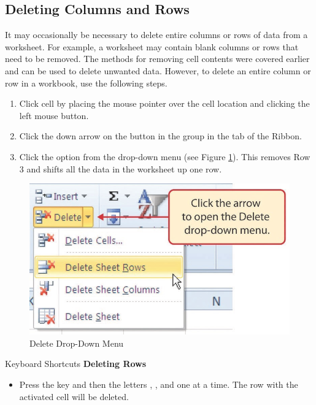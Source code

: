 \subsection{Deleting Columns and Rows}

It may occasionally be necessary to delete entire columns or rows of data from a worksheet. For example, a worksheet may contain blank columns or rows that need to be removed. The methods for removing cell contents were covered earlier and can be used to delete unwanted data. However, to delete an entire column or row in a workbook, use the following steps.

\begin{enumerate}
	\item Click cell  by placing the mouse pointer over the cell location and clicking the left mouse button.
	\item Click the down arrow on the  button in the  group in the  tab of the Ribbon.
	\item Click the  option from the drop-down menu (see Figure \ref{01:fig31}). This removes Row 3 and shifts all the data in the worksheet up one row.
\end{enumerate}

\begin{figure}[H]
	\centering
	\includegraphics[width=\maxwidth{.95\linewidth}]{gfx/ch01_fig31}
	\caption{Delete Drop-Down Menu}
	\label{01:fig31}
\end{figure}

\begin{center}
	\begin{shtcutbox}{Keyboard Shortcuts}
		\textbf{Deleting Rows}
		\\
		\begin{itemize}
			\setlength{\itemsep}{0pt}
			\setlength{\parskip}{0pt}
			\setlength{\parsep}{0pt}
			
			\item Press the  key and then the letters , , and  one at a time. The row with the activated cell will be deleted.
			
		\end{itemize}
	\end{shtcutbox}
\end{center}

